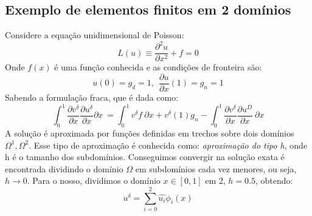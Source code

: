 \subsection{Exemplo de elementos finitos em 2 domínios}
 Considere a equação unidimensional de Poisson:
\begin{equation}
L(u) \equiv \frac{\partial^2 u}{\partial x^2} + f = 0
\end{equation}
 Onde $f(x)$ é uma função conhecida e as condições de fronteira são:
\begin{equation}
u(0) = g_d= 1,\ \ \frac{\partial u}{\partial x}(1)= g_n = 1
\end{equation}
 Sabendo a formulação fraca, que é dada como:
\begin{equation}\label{eq:weakform}
\int^1_0 \frac{\partial v^\delta}{\partial x} \frac{\partial u^\delta}{\partial x} \partial x\ = \int^1_0v^\delta f\ \partial x +v^\delta(1)g_n - \int^1_0 \frac{\partial v^\delta}{\partial x} \frac{\partial u^D}{\partial x}\ \partial x  
\end{equation}
 A solução é aproximada por funções definidas em trechos sobre dois domínios $\Omega^1,\Omega^2$. Esse tipo de aproximação é conhecida como: \emph{aproximação do tipo h}, onde h é o tamanho dos subdomínios. Conseguimos convergir na solução exata é encontrada dividindo o domínio $\Omega$ em subdomínios cada vez menores, ou seja, $h\rightarrow 0$. Para o nosso, dividimos o domínio $x \in [0,1]$ em 2, $h = 0.5$, obtendo:
\begin{equation}
u^\delta = \sum^2_{i=0} \hat{u_i}\phi_i(x) 
\end{equation} 
